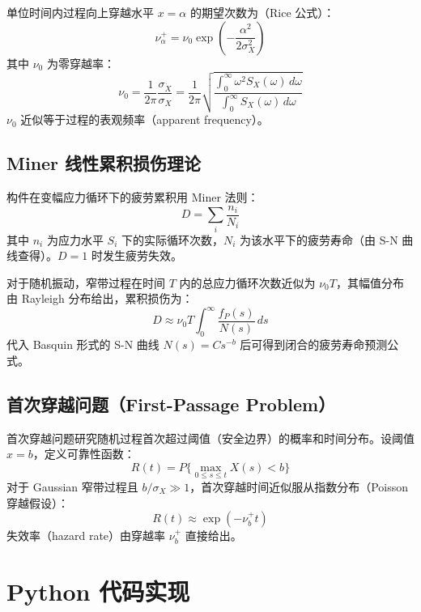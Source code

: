 \begin{definition}
单位时间内过程向上穿越水平 $x = \alpha$ 的期望次数为（Rice 公式）：
\[
\nu_{\alpha}^{+} = \nu_0 \exp\left(-\frac{\alpha^{2}}{2\sigma_X^{2}}\right)
\]
其中 $\nu_0$ 为零穿越率：
\[
\nu_0 = \frac{1}{2\pi}\frac{\sigma_{\dot{X}}}{\sigma_X} = \frac{1}{2\pi}\sqrt{\frac{\int_0^{\infty} \omega^{2} S_X(\omega)\,d\omega}{\int_0^{\infty} S_X(\omega)\,d\omega}}
\]
$\nu_0$ 近似等于过程的表观频率（apparent frequency）。
\end{definition}

\subsection{Miner 线性累积损伤理论}
构件在变幅应力循环下的疲劳累积用 Miner 法则：
\[
D = \sum_i \frac{n_i}{N_i}
\]
其中 $n_i$ 为应力水平 $S_i$ 下的实际循环次数，$N_i$ 为该水平下的疲劳寿命（由 S-N 曲线查得）。$D = 1$ 时发生疲劳失效。

对于随机振动，窄带过程在时间 $T$ 内的总应力循环次数近似为 $\nu_0 T$，其幅值分布由 Rayleigh 分布给出，累积损伤为：
\[
D \approx \nu_0 T \int_0^{\infty} \frac{f_P(s)}{N(s)}\,ds
\]
代入 Basquin 形式的 S-N 曲线 $N(s) = C s^{-b}$ 后可得到闭合的疲劳寿命预测公式。

\subsection{首次穿越问题（First-Passage Problem）}
首次穿越问题研究随机过程首次超过阈值（安全边界）的概率和时间分布。设阈值 $x = b$，定义可靠性函数：
\[
R(t) = P\{\max_{0 \le s \le t} X(s) < b\}
\]
对于 Gaussian 窄带过程且 $b/\sigma_X \gg 1$，首次穿越时间近似服从指数分布（Poisson 穿越假设）：
\[
R(t) \approx \exp\left(-\nu_b^{+} t\right)
\]
失效率（hazard rate）由穿越率 $\nu_b^{+}$ 直接给出。

\section{Python 代码实现}
